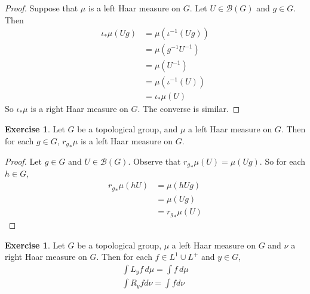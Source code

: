 \documentclass{book}
\theoremstyle{definition}
\newtheorem{ex}[definition]{Exercise}
\newcommand{\MB}{\mathcal{B}}
\newcommand{\lex}[1]{\label{ex:#1}}
\DeclareMathOperator*{\0}{\mbf{0}}
\DeclareMathOperator*{\1}{\mbf{1}}
\newcommand{\dmu}{\, d \mu}
\begin{document}
	\begin{proof}
		Suppose that $\mu$ is a left Haar measure on $G$. Let $U \in \MB(G)$ and $g \in G$. Then 
		\begin{align*}
			\iota_*\mu(Ug)
			& = \mu(\iota^{-1}(Ug)) \\
			&= \mu (g^{-1}U^{-1}) \\
			&= \mu (U^{-1}) \\
			&= \mu(\iota^{-1}(U)) \\
			&= \iota_*\mu(U)
		\end{align*}
		So $\iota_*\mu$ is a right Haar measure on $G$. The converse is similar.
	\end{proof}

	\begin{ex} \lex{00000} 
		Let $G$ be a topological group, and $\mu$ a left Haar measure on $G$. Then for each $g \in G$, ${r_{g}}_*\mu$ is a left Haar measure on $G$.
	\end{ex}

	\begin{proof}
		Let $g \in G$ and $U \in \MB(G)$. Observe that ${r_{g}}_*\mu(U) = \mu(Ug)$. So for each $h \in G$, 
		\begin{align*}
			{r_{g}}_*\mu(hU) 
			& = \mu(hUg) \\
			& =  \mu(Ug) \\
			& = {r_{g}}_*\mu(U)
		\end{align*}
	\end{proof}
	
	\begin{ex} \lex{00000} 
		Let $G$ be a topological group, $\mu$ a left Haar measure on $G$ and $\nu$ a right Haar measure on $G$. Then for each $f \in L^1 \cup L^+$ and $y \in G$, 
		\begin{align}
			\int L_y f \dmu = \int f \dmu \\
			\int R_y f d\nu = \int f d\nu
		\end{align}
	\end{ex}
	
\end{document}
